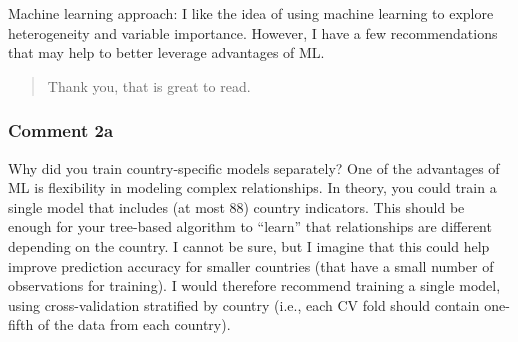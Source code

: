 \documentclass[11pt]{article}
\newenvironment{response}
{\begin{quote}\color{black}}
{\end{quote}}
\begin{document}
\begin{commentbox}
    Machine learning approach: I like the idea of using machine learning to explore heterogeneity and variable importance. However, I have a few recommendations that may help to better leverage advantages of ML.
\end{commentbox}

\begin{response}
    Thank you, that is great to read.
\end{response}

\subsubsection*{Comment 2a}\label{comment_R2_2a}

\begin{commentbox}
    Why did you train country-specific models separately? One of the advantages of ML is flexibility in modeling complex relationships. In theory, you could train a single model that includes (at most 88) country indicators. This should be enough for your tree-based algorithm to “learn” that relationships are different depending on the country. I cannot be sure, but I imagine that this could help improve prediction accuracy for smaller countries (that have a small number of observations for training). I would therefore recommend training a single model, using cross-validation stratified by country (i.e., each CV fold should contain one-fifth of the data from each country).
\end{commentbox}
\end{document}
